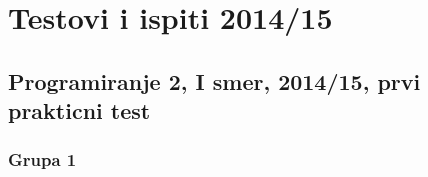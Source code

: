\chapter{Testovi i ispiti 2014/15}


\section{Programiranje 2, I smer, 2014/15, prvi prakticni test}


\subsection{Grupa 1}

